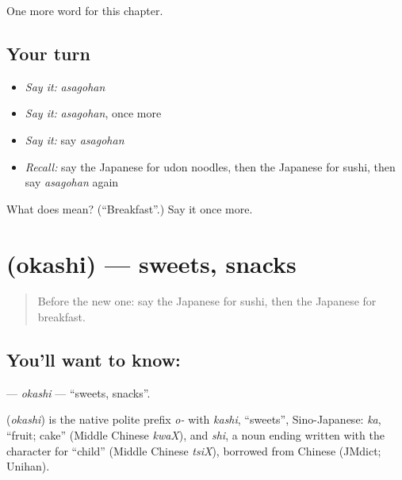 \begin{grammarlens}[title={What you've built}]
One more word for this chapter.
\end{grammarlens}

\subsection*{Your turn}
\begin{itemize}
\raggedright
  \item \emph{Say it:} \emph{asagohan}
  \item \emph{Say it:} \emph{asagohan}, once more
  \item \emph{Say it:} say \emph{asagohan}
  \item \emph{Recall:} say the Japanese for udon noodles, then the Japanese for sushi, then say \emph{asagohan} again
\end{itemize}

\begin{tcolorbox}[breakable,colback=teal!4,colframe=teal!35!black,title={Before you move on}]
What does  mean? (\textquotedblleft{}Breakfast\textquotedblright{}.) Say it once more.
\end{tcolorbox}
\section[\texorpdfstring{\ja{おかし} (okashi)}{おかし (okashi)}]{ (okashi) — sweets, snacks}

\label{lesson:JA-C35-okashi}



\begin{quote}
Before the new one: say the Japanese for sushi, then the Japanese for breakfast.
\end{quote}

\subsection*{You'll want to know: }
\textbf{} — \emph{okashi} — \textquotedblleft{}sweets, snacks\textquotedblright{}.

\begin{cousinweb}
\textbf{} (\emph{okashi}) is the native polite prefix \emph{o-} with \emph{kashi}, \textquotedblleft{}sweets\textquotedblright{}, Sino-Japanese: \emph{ka}, \textquotedblleft{}fruit; cake\textquotedblright{} (Middle Chinese \emph{kwaX}), and \emph{shi}, a noun ending written with the character for \textquotedblleft{}child\textquotedblright{} (Middle Chinese \emph{tsiX}), borrowed from Chinese (JMdict; Unihan).
\end{cousinweb}

